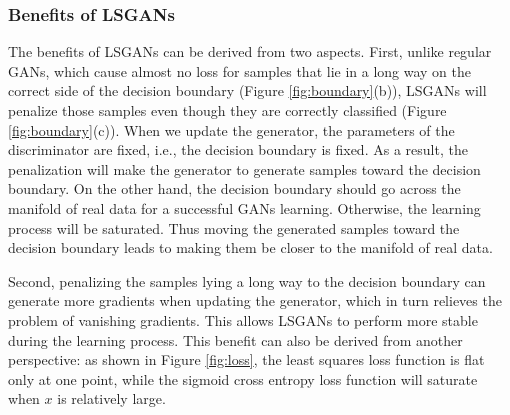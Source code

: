 \documentclass{article} %
\begin{document}
\subsubsection{Benefits of LSGANs}
The benefits of LSGANs can be derived from two aspects. First, unlike regular GANs, which cause almost no loss for samples that lie in a long way on the correct side of the decision boundary (Figure \ref{fig:boundary}(b)), LSGANs will penalize those samples even though they are correctly classified (Figure \ref{fig:boundary}(c)). When we update the generator, the parameters of the discriminator are fixed, i.e., the decision boundary is fixed. As a result, the penalization will make the generator to generate samples toward the decision boundary. On the other hand, the decision boundary should go across the manifold of real data for a successful GANs learning. Otherwise, the learning process will be saturated. Thus moving the generated samples toward the decision boundary leads to making them be closer to the manifold of real data. 

Second, penalizing the samples lying a long way to the decision boundary can generate more gradients when updating the generator, which in turn relieves the problem of vanishing gradients. This allows LSGANs to perform more stable during the learning process. This benefit can also be derived from another perspective: as shown in Figure \ref{fig:loss}, the least squares loss function is flat only at one point, while the sigmoid cross entropy loss function will saturate when $x$ is relatively large.
\end{document}
